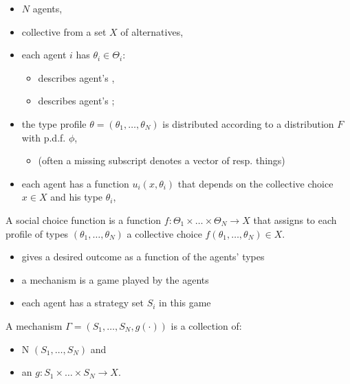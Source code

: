 \documentclass[english,handout]{beamer}		%
\def\lyxframeend{} %
\begin{document}
\begin{itemize}
	\item $N$ agents,
	\item collective  from a set $X$ of alternatives,
	\item each agent $i$ has  $\theta_i\in\Theta_{i}$:
	\begin{itemize}
		\item describes agent's ,
		\item describes agent's ;
	\end{itemize}
	\item the type profile $\theta=(\theta_1,\dots,\theta_{N})$ is distributed according to a distribution $F$ with p.d.f. $\phi$,
	\begin{itemize}
		\item (often a missing subscript denotes a vector of resp. things)
	\end{itemize}
	\item each agent has a  function $u_{i}(x,\theta_{i})$ that depends on the collective choice $x \in X$ and his type $\theta_i$,
\end{itemize}
\lyxframeend


\begin{definition}
	A \alert{social choice function} is a function $f:\Theta_{1}\times \dots\times\Theta_{N}\rightarrow X$ that assigns to each profile of types $(\theta_{1},\dots,\theta_{N})$ a collective choice $f(\theta_{1},\dots,\theta_{N})\in X$.
\end{definition}
\begin{itemize}
	\item gives a desired outcome as a function of the agents' types
\end{itemize}
\lyxframeend


\begin{itemize}
	\item a mechanism is a game played by the agents
	\item each agent has a strategy set $S_{i}$ in this game
\end{itemize}
\begin{definition}[mechanism]
	A \alert{mechanism} $\Gamma=(S_{1},\dots,S_{N},g(\cdot))$ is a collection of: 
	\begin{itemize}
		\item N  $(S_{1},\dots,S_{N})$ and 
		\item an  $g:S_{1}\times\dots\times S_{N}\rightarrow X$.
	\end{itemize}
\end{definition}
\lyxframeend
\end{document}
